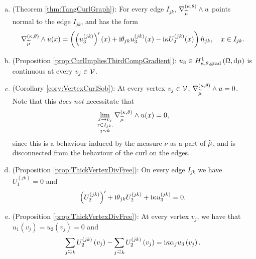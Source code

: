 \begin{enumerate}[(a)]
	\item (Theorem \ref{thm:TangCurlGraph}): For every edge $I_{jk}$, $\nabla_{\widetilde{\mu}}^{\left( \kappa, \theta \right)}\wedge u$ points normal to the edge $I_{jk}$, and has the form
	\begin{align*}
		\nabla_{\widetilde{\mu}}^{\left( \kappa, \theta \right)}\wedge u(x) = \left(  \left( u_3^{(jk)} \right)'(x) + \mathrm{i}\theta_{jk} u_3^{(jk)}(x) - \mathrm{i}\kappa U_2^{(jk)}(x)  \right) \hat{n}_{jk}, \quad x\in I_{jk}.
	\end{align*}
	\item (Proposition \ref{prop:CurlImpliesThirdCompGradient}): $u_3\in H^1_{\kappa,\theta,\mathrm{grad}}\left( \Omega, \mathrm{d}\mu \right)$ is continuous at every $v_j\in\mathcal{V}$.
	\item (Corollary \ref{cory:VertexCurlSob}): At every vertex $v_j\in\mathcal{V}$, $\nabla_{\widetilde{\mu}}^{\left( \kappa, \theta \right)}\wedge u = 0$.
	Note that this \emph{does not} necessitate that
	\begin{align*}
		\lim_{\substack{x\rightarrow v_j \\ x\in I_{jk}, \\ j\sim k}}\nabla_{\widetilde{\mu}}^{\left( \kappa, \theta \right)}\wedge u(x) = 0,
	\end{align*}
	since this is a behaviour induced by the measure $\nu$ as a part of $\widetilde{\mu}$, and is disconnected from the behaviour of the curl on the edges.
	\item (Proposition \ref{prop:ThickVertexDivFree}): On every edge $I_{jk}$ we have $U_1^{(jk)}=0$ and
	\begin{align*}
		\left( U_2^{(jk)} \right)' + \mathrm{i}\theta_{jk} U_2^{(jk)} + \mathrm{i}\kappa u_3^{(jk)} = 0.
	\end{align*}
	\item (Proposition \ref{prop:ThickVertexDivFree}): At every vertex $v_j$, we have that $u_1(v_j) = u_2(v_j) = 0$ and
	\begin{align*}
		\sum_{j\conRight k} U_2^{(jk)}\bracs{v_j} - \sum_{j\conLeft k} U_2^{(jk)}\bracs{v_j} = \rmi\wavenumber\alpha_j u_3\bracs{v_j}.
	\end{align*}
\end{enumerate}

